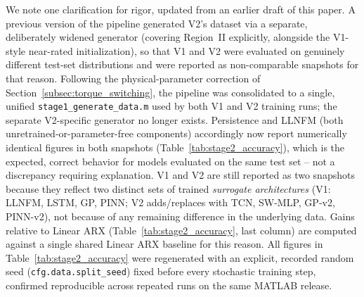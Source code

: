 We note one clarification for rigor, updated from an earlier draft of
this paper. A previous version of the pipeline generated V2's dataset
via a separate, deliberately widened generator (covering Region~II
explicitly, alongside the V1-style near-rated initialization), so that
V1 and V2 were evaluated on genuinely different test-set
distributions and were reported as non-comparable snapshots for that
reason. Following the physical-parameter correction of
Section~\ref{subsec:torque_switching}, the pipeline was consolidated
to a single, unified \texttt{stage1\_generate\_data.m} used by both V1
and V2 training runs; the separate V2-specific generator no longer
exists. Persistence and LLNFM (both unretrained-or-parameter-free
components) accordingly now report numerically identical figures in
both snapshots (Table~\ref{tab:stage2_accuracy}), which is the
expected, correct behavior for models evaluated on the same test set
-- not a discrepancy requiring explanation. V1 and V2 are still
reported as two snapshots because they reflect two distinct sets of
trained \emph{surrogate architectures} (V1: LLNFM, LSTM, GP, PINN; V2
adds/replaces with TCN, SW-MLP, GP-v2, PINN-v2), not because of any
remaining difference in the underlying data. Gains relative to Linear
ARX (Table~\ref{tab:stage2_accuracy}, last column) are computed
against a single shared Linear ARX baseline for this reason. All
figures in Table~\ref{tab:stage2_accuracy} were regenerated with an
explicit, recorded random seed (\texttt{cfg.data.split\_seed}) fixed
before every stochastic training step, confirmed reproducible across
repeated runs on the same MATLAB release.

